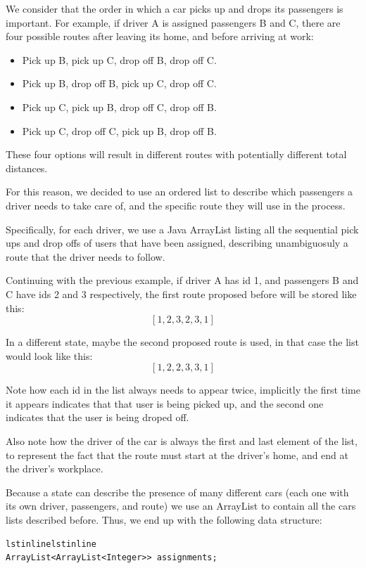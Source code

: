 \documentclass[12]{article}
\begin{document}
We consider that the order in which a car picks up and drops its passengers is important. For example, if driver A is assigned passengers B and C, there are four possible routes after leaving its home, and before arriving at work:

\begin{itemize}
	\item Pick up B, pick up C, drop off B, drop off C.
	\item Pick up B, drop off B, pick up C, drop off C.
    \item Pick up C, pick up B, drop off C, drop off B.
    \item Pick up C, drop off C, pick up B, drop off B.
\end{itemize}

These four options will result in different routes with potentially different total distances.

For this reason, we decided to use an ordered list to describe which passengers a driver needs to take care of, and the specific route they will use in the process.

Specifically, for each driver, we use a Java ArrayList listing all the sequential pick ups and drop offs of users that have been assigned, describing unambiguosuly a route that the driver needs to follow.

Continuing with the previous example, if driver A has id 1, and passengers B and C have ids 2 and 3 respectively, the first route proposed before will be stored like this: $$[1, 2, 3, 2, 3, 1]$$

In a different state, maybe the second proposed route is used, in that case the list would look like this: $$[1, 2, 2, 3, 3, 1]$$

Note how each id in the list always needs to appear twice, implicitly the first time it appears indicates that that user is being picked up, and the second one indicates that the user is being droped off.

Also note how the driver of the car is always the first and last element of the list, to represent the fact that the route must start at the driver's home, and end at the driver's workplace.

Because a state can describe the presence of many different cars (each one with its own driver, passengers, and route) we use an ArrayList to contain all the cars lists described before. Thus, we end up with the following data structure:

\begin{lstlisting}lstinlinelstinline
ArrayList<ArrayList<Integer>> assignments;
\end{lstlisting}
\end{document}
